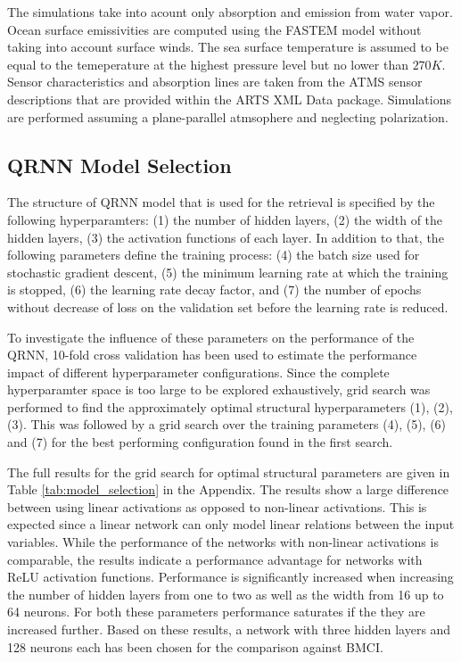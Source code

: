 \documentclass[journal abbreviation, manuscript]{copernicus}
\begin{document}
   The simulations take into acount only absorption and emission from water
   vapor. Ocean surface emissivities are computed using the FASTEM \cite{fastem}
   model without taking into account surface winds. The sea surface temperature
   is assumed to be equal to the temeperature at the highest pressure level but
   no lower than $270\unit{K}$. Sensor characteristics and absorption
   lines are taken from the ATMS sensor descriptions that are provided within
   the ARTS XML Data package. Simulations are performed assuming a
   plane-parallel atmsophere and neglecting polarization.

\subsection{QRNN Model Selection}

  The structure of QRNN model that is used for the retrieval is specified by the
  following hyperparamters: (1) the number of hidden layers, (2) the width of
  the hidden layers, (3) the activation functions of each layer. In addition to
  that, the following parameters define the training process: (4) the batch size
  used for stochastic gradient descent, (5) the minimum learning rate at which
  the training is stopped, (6) the learning rate decay factor, and (7) the
  number of epochs without decrease of loss on the validation set before
  the learning rate is reduced.

   To investigate the influence of these parameters on the performance of the
   QRNN, 10-fold cross validation has been used to estimate the performance
   impact of different hyperparameter configurations. Since the complete
   hyperparamter space is too large to be explored exhaustively, grid search was
   performed to find the approximately optimal structural hyperparameters (1),
   (2), (3). This was followed by a grid search over the training parameters
   (4), (5), (6) and (7) for the best performing configuration found in the
   first search.

   The full results for the grid search for optimal structural parameters are
   given in Table \ref{tab:model_selection} in the Appendix. The results show a
   large difference between using linear activations as opposed to non-linear
   activations. This is expected since a linear network can only model linear
   relations between the input variables. While the performance of the networks
   with non-linear activations is comparable, the results indicate a performance
   advantage for networks with ReLU activation functions. Performance is
   significantly increased when increasing the number of hidden layers from one
   to two as well as the width from 16 up to 64 neurons. For both these
   parameters performance saturates if the they are increased further. Based on
   these results, a network with three hidden layers and 128 neurons each has
   been chosen for the comparison against BMCI.
\end{document}
